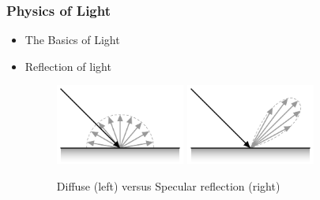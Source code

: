 \documentclass[12pt]{beamer}
\begin{document}
  \begin{frame}
    \frametitle{Physics of Light}
    \begin{itemize}
      \item The Basics of Light
      \item Reflection of light %
      \begin{figure}
        \includegraphics[width=0.4\textwidth]{diffuse}
        \includegraphics[width=0.4\textwidth]{specular}
        \caption{Diffuse (left) versus Specular reflection (right)}\label{fig:diffuse_specular}
      \end{figure}

    \end{itemize}
  \end{frame}
\end{document}
